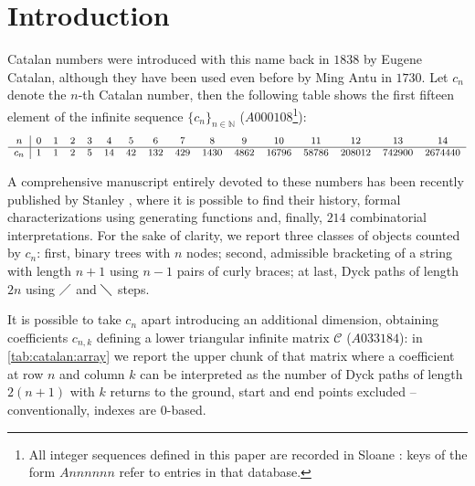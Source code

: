 
\section{Introduction}

\noindent Catalan numbers were introduced with this name back in $1838$ by
Eugene Catalan, although they have been used even before by Ming Antu
in $1730$. Let $c_{n}$ denote the $n$-th Catalan number, then the following
table shows the first fifteen element of the infinite sequence 
$\lbrace c_{n}\rbrace_{n\in\mathbb{N}}$ ($A000108$\footnote{All integer sequences
defined in this paper are recorded in Sloane \cite{sloane:oeis}: keys of
the form $Annnnnn$ refer to entries in that database.}):
\begin{displaymath}
    \footnotesize
    \begin{array}{c|ccccccccccccccc}
        n & 0 & 1 & 2 & 3 & 4 & 5 & 6 & 7 & 8 & 9 & 10 & 11 & 12 & 13 & 14 \\
        \hline
        c_{n} & 1 & 1 & 2 & 5 & 14 & 42 & 132 & 429 & 1430 & 4862 & 16796 & 58786 & 208012 & 742900 & 2674440
    \end{array}
\end{displaymath}

A comprehensive manuscript entirely devoted to these numbers has been recently
published by Stanley \cite{stanley:2015}, where it is possible to find their history,
formal characterizations using generating functions and, finally, $214$ combinatorial 
interpretations.  For the sake of clarity, we report three classes of objects counted by 
$c_{n}$: first, binary trees with $n$ nodes; 
second, admissible bracketing of a string with length $n+1$ using $n-1$ pairs
of curly braces; at last, Dyck paths of length $2n$ using $\diagup$ and $\diagdown$ steps.

It is possible to take $c_{n}$ apart introducing an additional dimension,
obtaining coefficients $c_{n,k}$ defining a lower triangular infinite 
matrix $\mathcal{C}$ ($A033184$): in \autoref{tab:catalan:array} 
we report the upper chunk of that matrix where a coefficient at row $n$ 
and column $k$ can be interpreted as the number
of Dyck paths of length $2(n+1)$ with $k$ returns to the ground, start
and end points excluded -- conventionally, indexes are $0$-based.



